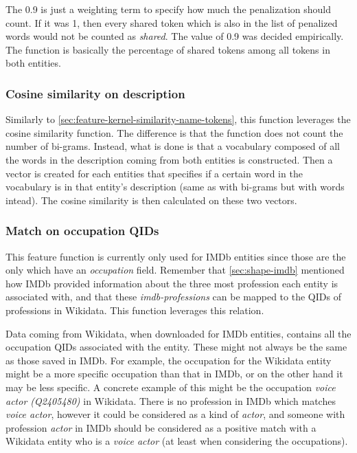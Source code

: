 \documentclass[epsfig,a4paper,11pt,titlepage,twoside,openany]{book}
\begin{document}
The 0.9 is just a weighting term to specify how much the penalization should count. If it was 1, then every shared token which is also in the list of penalized words would not be counted as \textit{shared}. The value of 0.9 was decided empirically. The function is basically the percentage of shared tokens among all tokens in both entities.


\subsubsection{Cosine similarity on description}
\label{sec:feature-cosine-similarity-description}

Similarly to \autoref{sec:feature-kernel-similarity-name-tokens}, this function leverages the cosine similarity function. The difference is that the function does not count the number of bi-grams. Instead, what is done is that a vocabulary composed of all the words in the description coming from both entities is constructed. Then a vector is created for each entities that specifies if a certain word in the vocabulary is in that entity's description (same as with bi-grams but with words intead). The cosine similarity is then calculated on these two vectors.


\subsubsection{Match on occupation QIDs}
\label{sec:feature-occupations}

This feature function is currently only used for IMDb entities since those are the only which have an \textit{occupation} field. Remember that \autoref{sec:shape-imdb} mentioned how IMDb provided information about the three most profession each entity is associated with, and that these \textit{imdb-professions} can be mapped to the QIDs of professions in Wikidata. This function leverages this relation. 

Data coming from Wikidata, when downloaded for IMDb entities, contains all the occupation QIDs associated with the entity. These might not always be the same as those saved in IMDb. For example, the occupation for the Wikidata entity might be a more specific occupation than that in IMDb, or on the other hand it may be less specific. A concrete example of this might be the occupation \textit{voice actor (Q2405480)} in Wikidata. There is no profession in IMDb which matches \textit{voice actor}, however it could be considered as a kind of \textit{actor}, and someone with profession \textit{actor} in IMDb should be considered as a positive match with a Wikidata entity who is a \textit{voice actor} (at least when considering the occupations).
\end{document}
